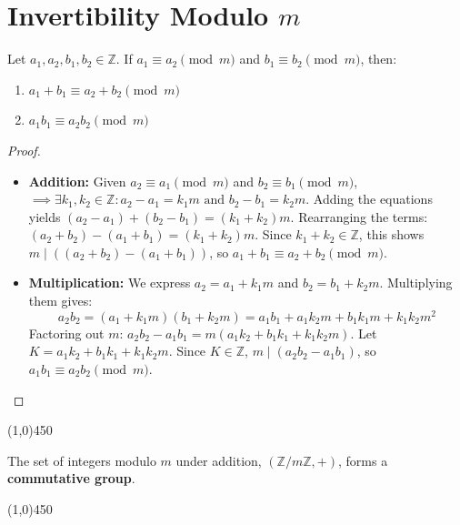 \section{Invertibility Modulo \texorpdfstring{$m$}{m}}

\begin{proposition}[Compatibility]
Let $a_1, a_2, b_1, b_2 \in \mathbb{Z}$. If $a_1 \equiv a_2 \pmod{m}$ and $b_1 \equiv b_2 \pmod{m}$, then:
\begin{enumerate}
    \item $a_1 + b_1 \equiv a_2 + b_2 \pmod{m}$
    \item $a_1b_1 \equiv a_2b_2 \pmod{m}$
\end{enumerate}
\end{proposition}
\begin{proof}
    \leavevmode
\begin{itemize}
    \item \textbf{Addition:} Given $a_2 \equiv a_1 \pmod{m}$ and $b_2 \equiv b_1 \pmod{m}$, $\implies \exists k_1, k_2 \in \mathbb{Z} : a_2 - a_1 = k_1 m \text{ and } b_2 - b_1 = k_2 m$.
    Adding the equations yields $(a_2 - a_1) + (b_2 - b_1) = (k_1 + k_2) m$.
    Rearranging the terms: $(a_2 + b_2) - (a_1 + b_1) = (k_1 + k_2) m$.
    Since $k_1 + k_2 \in \mathbb{Z}$, this shows $m \mid ((a_2 + b_2) - (a_1 + b_1))$, so $a_1 + b_1 \equiv a_2 + b_2 \pmod{m}$.
    \item \textbf{Multiplication:} We express $a_2 = a_1 + k_1 m$ and $b_2 = b_1 + k_2 m$.
    Multiplying them gives:
    $$ a_2b_2 = (a_1 + k_1 m)(b_1 + k_2 m) = a_1b_1 + a_1 k_2 m + b_1 k_1 m + k_1 k_2 m^2 $$
    Factoring out $m$: $a_2b_2 - a_1b_1 = m(a_1 k_2 + b_1 k_1 + k_1 k_2 m)$.
    Let $K = a_1 k_2 + b_1 k_1 + k_1 k_2 m$. Since $K \in \mathbb{Z}$, $m \mid (a_2b_2 - a_1b_1)$, so $a_1b_1 \equiv a_2b_2 \pmod{m}$. \qedhere
\end{itemize}
\end{proof}

\begin{center}
    \vspace{10pt}
    \line(1,0){450}
    \vspace{25pt}
\end{center}

\begin{proposition}
The set of integers modulo $m$ under addition, $(\mathbb{Z}/m\mathbb{Z}, +)$, forms a \textbf{commutative group}.
\end{proposition}

\begin{center}
    \vspace{10pt}
    \line(1,0){450}
    \vspace{25pt}
\end{center}

